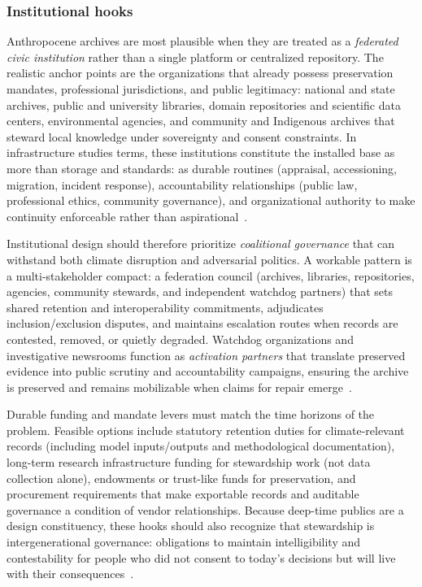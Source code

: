 \documentclass[acmsmall,screen]{acmart}
\begin{document}
\subsubsection*{Institutional hooks}
Anthropocene archives are most plausible when they are treated as a \emph{federated civic institution} rather than a single platform or centralized repository. The realistic anchor points are the organizations that already possess preservation mandates, professional jurisdictions, and public legitimacy: national and state archives, public and university libraries, domain repositories and scientific data centers, environmental agencies, and community and Indigenous archives that steward local knowledge under sovereignty and consent constraints. In infrastructure studies terms, these institutions constitute the installed base as more than storage and standards: as durable routines (appraisal, accessioning, migration, incident response), accountability relationships (public law, professional ethics, community governance), and organizational authority to make continuity enforceable rather than aspirational~\cite{starEthnographyInfrastructure1999a,aanestadInformationInfrastructuresChallenge2017,karastiStudyingInfrastructuringEthnographically2018a}.

Institutional design should therefore prioritize \emph{coalitional governance} that can withstand both climate disruption and adversarial politics. A workable pattern is a multi-stakeholder compact: a federation council (archives, libraries, repositories, agencies, community stewards, and independent watchdog partners) that sets shared retention and interoperability commitments, adjudicates inclusion/exclusion disputes, and maintains escalation routes when records are contested, removed, or quietly degraded. Watchdog organizations and investigative newsrooms function as \emph{activation partners} that translate preserved evidence into public scrutiny and accountability campaigns, ensuring the archive is preserved and remains mobilizable when claims for repair emerge~\cite{blankeReassemblingDigitalArchives2024,ghaddarSpectreArchiveTruth2016}.

Durable funding and mandate levers must match the time horizons of the problem. Feasible options include statutory retention duties for climate-relevant records (including model inputs/outputs and methodological documentation), long-term research infrastructure funding for stewardship work (not data collection alone), endowments or trust-like funds for preservation, and procurement requirements that make exportable records and auditable governance a condition of vendor relationships. Because deep-time publics are a design constituency, these hooks should also recognize that stewardship is intergenerational governance: obligations to maintain intelligibility and contestability for people who did not consent to today's decisions but will live with their consequences~\cite{holtorfCulturalHeritageFuture2020,rahm-skagebyHCIDeepTime2022,hanuschDeeptimeOrganizationsLearning2020}.
\end{document}

